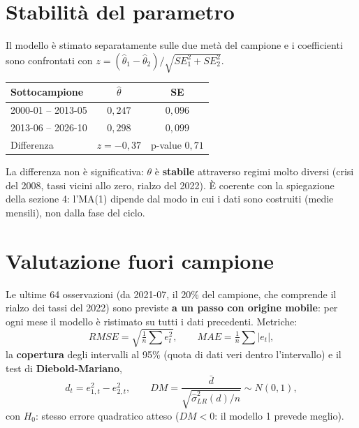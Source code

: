 \documentclass[11pt,a4paper]{article}
\begin{document}
\section{Stabilità del parametro}

Il modello è stimato separatamente sulle due metà del campione e i coefficienti sono confrontati con $z = (\hat\theta_1 - \hat\theta_2)/\sqrt{SE_1^2 + SE_2^2}$.

\begin{table}[H]
\centering
\begin{tabular}{lcc}
\toprule
Sottocampione & $\hat\theta$ & SE \\
\midrule
2000-01 -- 2013-05 & $0{,}247$ & $0{,}096$ \\
2013-06 -- 2026-10 & $0{,}298$ & $0{,}099$ \\
\midrule
Differenza & $z = -0{,}37$ & p-value $0{,}71$ \\
\bottomrule
\end{tabular}
\end{table}

La differenza non è significativa: $\theta$ è \textbf{stabile} attraverso regimi molto diversi (crisi del 2008, tassi vicini allo zero, rialzo del 2022). È coerente con la spiegazione della sezione 4: l'MA(1) dipende dal modo in cui i dati sono costruiti (medie mensili), non dalla fase del ciclo.

\section{Valutazione fuori campione}\label{sec:oos}

Le ultime 64 osservazioni (da 2021-07, il 20\% del campione, che comprende il rialzo dei tassi del 2022) sono previste \textbf{a un passo con origine mobile}: per ogni mese il modello è ristimato su tutti i dati precedenti. Metriche:
\[
RMSE = \sqrt{\tfrac1n\textstyle\sum e_t^2}, \qquad MAE = \tfrac1n\textstyle\sum |e_t|,
\]
la \textbf{copertura} degli intervalli al 95\% (quota di dati veri dentro l'intervallo) e il test di \textbf{Diebold-Mariano},
\[
d_t = e_{1,t}^2 - e_{2,t}^2, \qquad DM = \frac{\bar d}{\sqrt{\hat\sigma^2_{LR}(d)/n}} \sim N(0,1),
\]
con $H_0$: stesso errore quadratico atteso ($DM < 0$: il modello 1 prevede meglio).
\end{document}
